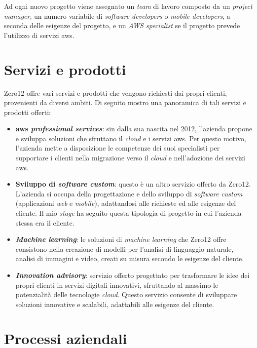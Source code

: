 \noindent
Ad ogni nuovo progetto viene assegnato un \textit{team} di lavoro composto da un \textit{project manager}, un numero variabile di \textit{software developers} o \textit{mobile developers}, a seconda delle esigenze del progetto, e un \textit{AWS specialist} se il progetto prevede l'utilizzo di servizi \gls{aws}. 

\section{Servizi e prodotti}
Zero12 offre vari servizi e prodotti che vengono richiesti dai propri clienti, provenienti da diversi ambiti.
Di seguito mostro una panoramica di tali servizi e prodotti offerti:
\begin{itemize}
    \item \textbf{\gls{aws} \textit{professional services}}: sin dalla sua nascita nel 2012, l'azienda propone e sviluppa soluzioni che sfruttano il \textit{cloud} e i servizi \gls{aws}. Per questo motivo, l'azienda mette a disposizione le competenze dei suoi specialisti
    per supportare i clienti nella migrazione verso il \textit{cloud} e nell'adozione dei servizi \gls{aws}.
    \item \textbf{Sviluppo di \textit{software custom}}: questo è un altro servizio offerto da Zero12. L'azienda si occupa della progettazione e dello sviluppo di \textit{software custom} (applicazioni \textit{web} e \textit{mobile}), adattandosi alle richieste ed alle esigenze del cliente. Il mio \textit{stage} ha seguito questa tipologia di progetto in cui l'azienda stessa era il cliente.
    \item \textbf{\textit{Machine learning}}: le soluzioni di \textit{machine learning} che Zero12 offre consistono nella creazione di modelli per l'analisi di linguaggio naturale, analisi di immagini e video, creati su misura secondo le esigenze del cliente.
    \item \textbf{\textit{Innovation advisory}}: servizio offerto progettato per trasformare le idee dei propri clienti in servizi digitali innovativi, sfruttando al massimo le potenzialità delle tecnologie \textit{cloud}. Questo servizio consente di sviluppare 
    soluzioni innovative e scalabili, adattabili alle esigenze del cliente.
\end{itemize}
\section{Processi aziendali}
